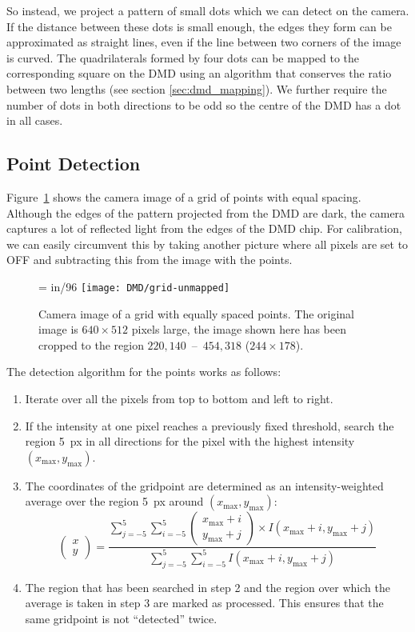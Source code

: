 So instead, we project a pattern of small dots which we can detect on the camera. If the distance between these dots is small enough, the edges they form can be approximated as straight lines, even if the line between two corners of the image is curved. The quadrilaterals formed by four dots can be mapped to the corresponding square on the DMD using an algorithm that conserves the ratio between two lengths (see section \ref{sec:dmd_mapping}). We further require the number of dots in both directions to be odd so the centre of the DMD has a dot in all cases.

\subsection*{Point Detection}
Figure~\ref{fig:point_matrix_example} shows the camera image of a grid of points with equal spacing. Although the edges of the pattern projected from the DMD are dark, the camera captures a lot of reflected light from the edges of the DMD chip. For calibration, we can easily circumvent this by taking another picture where all pixels are set to OFF and subtracting this from the image with the points.
\begin{figure}[htbp]
    \centering
    \pdfpxdimen= in/96\relax
    \texttt{[image: DMD/grid-unmapped]}
    \caption[Camera image of a grid with 165 equally spaced points]{Camera image of a grid with equally spaced points. The original image is $640\times 512$ pixels large, the image shown here has been cropped to the region $220,140$~--~$454,318$ ($244\times 178$).}
    \label{fig:point_matrix_example}
\end{figure}
The detection algorithm for the points works as follows:
\begin{enumerate}
    \item Iterate over all the pixels from top to bottom and left to right.
    \item If the intensity at one pixel reaches a previously fixed threshold, search the region \SI{5}{px} in all directions for the pixel with the highest intensity $(x_\text{max},y_\text{max})$.
    \item The coordinates of the gridpoint are determined as an intensity-weighted average over the region \SI{5}{px} around $(x_\text{max},y_\text{max})$: \[\begin{pmatrix}
        x \\ y
    \end{pmatrix} = \frac{\sum\limits_{j = -5}^5 \sum\limits_{i = -5}^5 \begin{pmatrix}
        x_\text{max} + i \\ y_\text{max} + j
    \end{pmatrix}\times I(x_\text{max} + i, y_\text{max} + j)}{\sum\limits_{j = -5}^5 \sum\limits_{i = -5}^5 I(x_\text{max} + i, y_\text{max} + j)} \]
    \item The region that has been searched in step 2 and the region over which the average is taken in step 3 are marked as processed. This ensures that the same gridpoint is not \enquote{detected} twice.
\end{enumerate}
